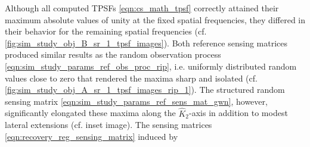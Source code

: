 Although
all computed \acp{TPSF}
\eqref{eqn:cs_math_tpsf} correctly attained
their maximum absolute values of
unity at
the fixed spatial frequencies,
they differed in
their behavior for
the remaining spatial frequencies
(cf. \cref{fig:sim_study_obj_B_sr_1_tpsf_images}).
Both reference sensing matrices produced
similar results as
the random observation process
\eqref{eqn:sim_study_params_ref_obs_proc_rip}, i.e.
uniformly distributed random values close to
zero that rendered
the maxima sharp and
isolated
(cf. \cref{fig:sim_study_obj_A_sr_1_tpsf_images_rip_1}).
The structured random sensing matrix
\eqref{eqn:sim_study_params_ref_sens_mat_gwn}, however, significantly elongated
these maxima along
the $\hat{K}_{2}$-axis in addition to
modest lateral extensions
(cf. inset image).
The sensing matrices
\eqref{eqn:recovery_reg_sensing_matrix} induced by
